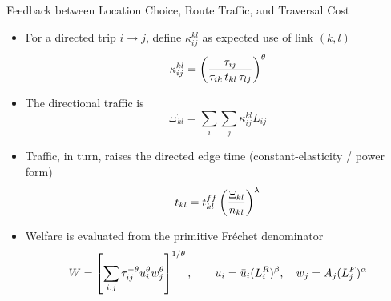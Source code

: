 \documentclass[11pt,aspectratio=169]{beamer}
\begin{document}
\begin{frame}{Feedback between Location Choice, Route Traffic, and Traversal Cost}
\begin{itemize}
  \item For a directed trip $i\to j$, define $\kappa^{kl}_{ij}$ as expected use of link $(k,l)$
  \vspace{-1em}\begin{equation}
    \kappa^{kl}_{ij} = \left( \frac{\tau_{ij}} {\tau_{ik}\,t_{kl}\,\tau_{lj}} \right)^\theta
  \vspace{-0.5em}\end{equation}
  \item The directional traffic is
  \begin{equation}\label{eq:Xi_c}
  \Xi_{kl} = \sum_i\sum_j \kappa^{kl}_{ij}L_{ij}
  \end{equation}
  \item Traffic, in turn, raises the directed edge time (constant-elasticity / power form)
  \vspace{-0.5em}\begin{equation}\label{eq:c_Xi}
    t_{kl} = t_{kl}^{ff} \left(\frac{\Xi_{kl}}{n_{kl}}\right)^{\lambda}
  \vspace{-0.5em}\end{equation}
  \item Welfare is evaluated from the primitive Fr\'echet denominator
  \vspace{-0.5em}\begin{equation}
    \bar W
    =
    \left[
    \sum_{i,j}\tau_{ij}^{-\theta}u_i^\theta w_j^\theta
    \right]^{1/\theta},
    \qquad
    u_i=\bar u_i(L_i^R)^\beta,\quad
    w_j=\bar A_j(L_j^F)^\alpha
  \vspace{-0.8em}\end{equation}
\end{itemize}
\end{frame}
\end{document}
